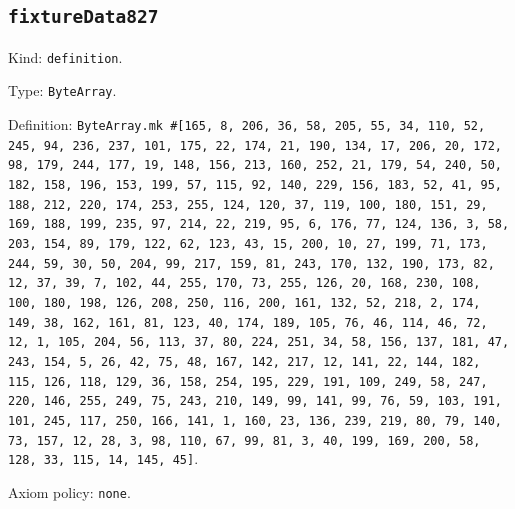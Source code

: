 \documentclass[11pt]{article}
\begin{document}
\subsection*{\texttt{fixtureData827}}
\noindent Kind: \texttt{definition}.\par
\noindent Type: \texttt{ByteArray}.\par
\noindent Definition: \texttt{ByteArray.mk \#[165, 8, 206, 36, 58, 205, 55, 34, 110, 52, 245, 94, 236, 237, 101, 175, 22, 174, 21, 190, 134, 17, 206, 20, 172, 98, 179, 244, 177, 19, 148, 156, 213, 160, 252, 21, 179, 54, 240, 50, 182, 158, 196, 153, 199, 57, 115, 92, 140, 229, 156, 183, 52, 41, 95, 188, 212, 220, 174, 253, 255, 124, 120, 37, 119, 100, 180, 151, 29, 169, 188, 199, 235, 97, 214, 22, 219, 95, 6, 176, 77, 124, 136, 3, 58, 203, 154, 89, 179, 122, 62, 123, 43, 15, 200, 10, 27, 199, 71, 173, 244, 59, 30, 50, 204, 99, 217, 159, 81, 243, 170, 132, 190, 173, 82, 12, 37, 39, 7, 102, 44, 255, 170, 73, 255, 126, 20, 168, 230, 108, 100, 180, 198, 126, 208, 250, 116, 200, 161, 132, 52, 218, 2, 174, 149, 38, 162, 161, 81, 123, 40, 174, 189, 105, 76, 46, 114, 46, 72, 12, 1, 105, 204, 56, 113, 37, 80, 224, 251, 34, 58, 156, 137, 181, 47, 243, 154, 5, 26, 42, 75, 48, 167, 142, 217, 12, 141, 22, 144, 182, 115, 126, 118, 129, 36, 158, 254, 195, 229, 191, 109, 249, 58, 247, 220, 146, 255, 249, 75, 243, 210, 149, 99, 141, 99, 76, 59, 103, 191, 101, 245, 117, 250, 166, 141, 1, 160, 23, 136, 239, 219, 80, 79, 140, 73, 157, 12, 28, 3, 98, 110, 67, 99, 81, 3, 40, 199, 169, 200, 58, 128, 33, 115, 14, 145, 45]}.\par
\noindent Axiom policy: \texttt{none}.\par
\end{document}
